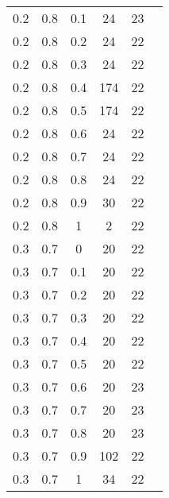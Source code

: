 \begin{table}
\begin{minipage}[h!]{0.10\hsize}
\begin{center}
{\begin{tabular}{c@{\hspace{5mm}}c@{\hspace{5mm}}c@{\hspace{5mm}}c@{\hspace{5mm}}c@{\hspace{5mm}}c}
				0.2     &0.8    &0.1    &24    &23\\
				0.2     &0.8    &0.2    &24    &22\\
				0.2     &0.8    &0.3    &24    &22\\
				0.2     &0.8    &0.4    &174   &22\\
				0.2     &0.8    &0.5    &174   &22\\
				0.2     &0.8    &0.6    &24    &22\\
				0.2     &0.8    &0.7    &24    &22\\
				0.2     &0.8    &0.8    &24    &22\\
				0.2     &0.8    &0.9    &30    &22\\
				0.2     &0.8    &1      &2     &22\\
				\midrule
				0.3     &0.7    &0      &20    &22\\
				0.3     &0.7    &0.1    &20    &22\\
				0.3     &0.7    &0.2    &20    &22\\
				0.3     &0.7    &0.3    &20    &22\\
				0.3     &0.7    &0.4    &20    &22\\
				0.3     &0.7    &0.5    &20    &22\\
				0.3     &0.7    &0.6    &20    &23\\
				0.3     &0.7    &0.7    &20    &23\\
				0.3     &0.7    &0.8    &20    &23\\
				0.3     &0.7    &0.9    &102   &22\\
				0.3     &0.7    &1      &34    &22\\
				\bottomrule
			\end{tabular}}
			\label{T:log111}
		\end{center}
	\end{minipage}
	\hfill
	\begin{minipage}[!h]{0.50\hsize}\centering
		\begin{center}
\end{center}
\end{minipage}
\end{table}
